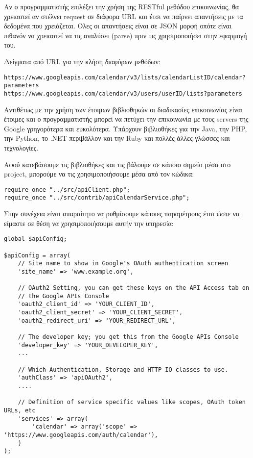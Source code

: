 Αν ο προγραμματιστής επιλέξει την χρήση της RESTful μεθόδου επικοινωνίας, θα χρειαστεί αν στέλνει request σε διάφορα URL και έτσι να παίρνει απαντήσεις με τα δεδομένα που χρειάζεται. Όλες οι απαντήσεις είναι σε JSON μορφή οπότε είναι πιθανόν να χρειαστεί να τις αναλύσει (parse) πριν τις χρησιμοποιήσει στην εφαρμογή του. 

Δείγματα από URL για την κλήση διαφόρων μεθόδων: 

\begin{verbatim}
https://www.googleapis.com/calendar/v3/lists/calendarListID/calendar?parameters
https://www.googleapis.com/calendar/v3/users/userID/lists?parameters
\end{verbatim}

Αντιθέτως με την χρήση των έτοιμων βιβλιοθηκών οι διαδικασίες επικοινωνίας είναι έτοιμες και ο προγραμματιστής μπορεί να πετύχει την επικοινωνία με τους servers της Google γρηγορότερα και ευκολότερα. 
Υπάρχουν βιβλιοθήκες για την Java, την PHP, την Python, το .NET περιβάλλον και την Ruby και πολλές άλλες γλώσσες και τεχνολογίες. 

Αφού κατεβάσουμε τις βιβλιοθήκες και τις βάλουμε σε κάποιο σημείο μέσα στο project, μπορούμε να τις χρησιμοποιήσουμε μέσα από τον κώδικα:

\begin{verbatim}
require_once "../src/apiClient.php";
require_once "../src/contrib/apiCalendarService.php";
\end{verbatim}

Στην συνέχεια είναι απαραίτητο να ρυθμίσουμε κάποιες παραμέτρους έτσι ώστε να είμαστε σε θέση να χρησιμοποιήσουμε αυτήν την υπηρεσία:

\begin{verbatim}
global $apiConfig;

$apiConfig = array(
    // Site name to show in Google's OAuth authentication screen
    'site_name' => 'www.example.org',

    // OAuth2 Setting, you can get these keys on the API Access tab on
    // the Google APIs Console
    'oauth2_client_id' => 'YOUR_CLIENT_ID',
    'oauth2_client_secret' => 'YOUR_CLIENT_SECRET',
    'oauth2_redirect_uri' => 'YOUR_REDIRECT_URL',

    // The developer key; you get this from the Google APIs Console
    'developer_key' => 'YOUR_DEVELOPER_KEY',
    ...

    // Which Authentication, Storage and HTTP IO classes to use.
    'authClass' => 'apiOAuth2',
    ....

    // Definition of service specific values like scopes, OAuth token URLs, etc
    'services' => array(
        'calendar' => array('scope' => 'https://www.googleapis.com/auth/calendar'),
    )
);
\end{verbatim}


